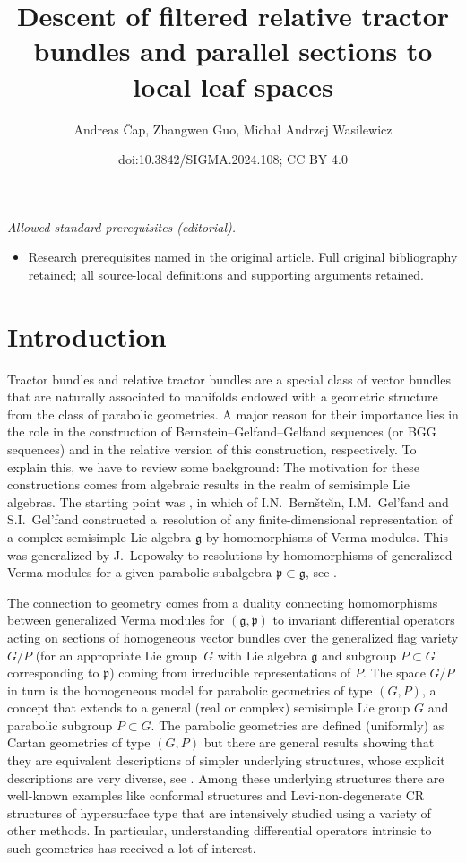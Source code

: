 \documentclass[10pt,a4paper]{amsart}
\title{Descent of filtered relative tractor bundles and parallel sections to local leaf spaces}
\author{Andreas Čap, Zhangwen Guo, Michał Andrzej Wasilewicz}
\date{doi:10.3842/SIGMA.2024.108; CC BY 4.0}
\numberwithin{equation}{section}
\def\frak{\mathfrak}
\begin{document}
\maketitle
\noindent\textit{Allowed standard prerequisites (editorial).}\begin{itemize}
\item Research prerequisites named in the original article. Full original bibliography retained; all source-local definitions and supporting arguments retained.
\end{itemize}\medskip
\section{Introduction}\label{1}
Tractor bundles and relative tractor bundles are a special class of vector bundles
that are naturally associated to manifolds endowed with a geometric structure from
the class of parabolic geometries. A major reason for their importance lies in the
role in the construction of Bernstein--Gelfand--Gelfand sequences (or BGG sequences)
and in the relative version of this construction, respectively. To explain this, we
have to review some background: The motivation for these constructions comes from
algebraic results in the realm of semisimple Lie algebras. The starting point was
\cite{BGG}, in which of I.N.~Bern{\v{s}}te{\u\i}n, I.M.~Gel'fand and S.I.~Gel'fand constructed a~resolution of any finite-dimensional
representation of a complex semisimple Lie algebra $\frak g$ by homomorphisms of
Verma modules. This was generalized by J.~Lepowsky to resolutions by homomorphisms of
generalized Verma modules for a given parabolic subalgebra $\frak p\subset\frak g$,
see \cite{Lepowsky}.

The connection to geometry comes from a duality connecting homomorphisms between
generalized Verma modules for $(\frak g,\frak p)$ to invariant differential operators
acting on sections of homogeneous vector bundles over the generalized flag variety
$G/P$ (for an appropriate Lie group~$G$ with Lie algebra $\frak g$ and subgroup
$P\subset G$ corresponding to $\frak p$) coming from irreducible representations of
$P$. The space $G/P$ in turn is the homogeneous model for parabolic geometries of
type $(G,P)$, a concept that extends to a general (real or complex) semisimple Lie
group $G$ and parabolic subgroup $P\subset G$. The parabolic geometries are defined
(uniformly) as Cartan geometries of type $(G,P)$ but there are general results
showing that they are equivalent descriptions of simpler underlying structures,
whose explicit descriptions are very diverse, see \cite{book}. Among these underlying
structures there are well-known examples like conformal structures and
Levi-non-degenerate CR structures of hypersurface type that are intensively studied
using a variety of other methods. In particular, understanding differential operators
intrinsic to such geometries has received a lot of interest.
\end{document}
